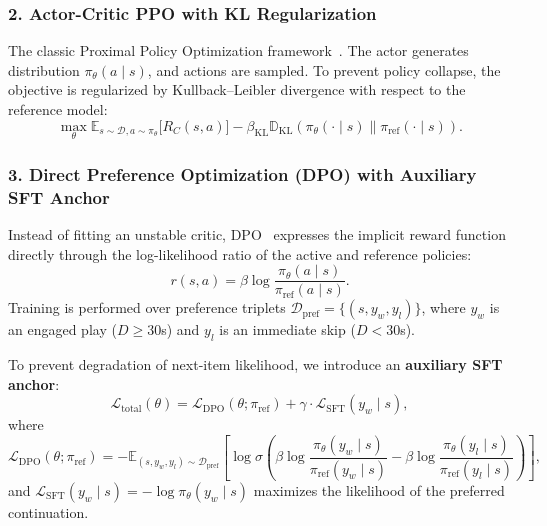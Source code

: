 \subsubsection{2. Actor-Critic PPO with KL Regularization}
The classic Proximal Policy Optimization framework~\cite{schulman2017proximal}. The actor generates distribution $\pi_\theta(a \mid s)$, and actions are sampled. To prevent policy collapse, the objective is regularized by Kullback--Leibler divergence with respect to the reference model:
\begin{equation}
    \max_\theta \mathbb{E}_{s \sim \mathcal{D}, a \sim \pi_\theta} \big[ R_C(s, a) \big] - \beta_{\text{KL}} \mathbb{D}_{\text{KL}}(\pi_\theta(\cdot \mid s) \parallel \pi_{\text{ref}}(\cdot \mid s)).
\end{equation}

\subsubsection{3. Direct Preference Optimization (DPO) with Auxiliary SFT Anchor}
Instead of fitting an unstable critic, DPO~\cite{rafailov2023direct} expresses the implicit reward function directly through the log-likelihood ratio of the active and reference policies:
\begin{equation}
    r(s, a) = \beta \log \frac{\pi_\theta(a \mid s)}{\pi_{\text{ref}}(a \mid s)}.
\end{equation}
Training is performed over preference triplets $\mathcal{D}_{\text{pref}} = \{(s, y_w, y_l)\}$, where $y_w$ is an engaged play ($D \ge 30$s) and $y_l$ is an immediate skip ($D < 30$s).

To prevent degradation of next-item likelihood, we introduce an \textbf{auxiliary SFT anchor}:
\begin{equation}
    \mathcal{L}_{\text{total}}(\theta) = \mathcal{L}_{\text{DPO}}(\theta; \pi_{\text{ref}}) + \gamma \cdot \mathcal{L}_{\text{SFT}}(y_w \mid s),
    \label{eq:dpo_sft}
\end{equation}
where
\begin{equation}
    \mathcal{L}_{\text{DPO}}(\theta; \pi_{\text{ref}}) = - \mathbb{E}_{(s, y_w, y_l) \sim \mathcal{D}_{\text{pref}}} \left[ \log \sigma \left( \beta \log \frac{\pi_\theta(y_w \mid s)}{\pi_{\text{ref}}(y_w \mid s)} - \beta \log \frac{\pi_\theta(y_l \mid s)}{\pi_{\text{ref}}(y_l \mid s)} \right) \right],
\end{equation}
and $\mathcal{L}_{\text{SFT}}(y_w \mid s) = - \log \pi_\theta(y_w \mid s)$ maximizes the likelihood of the preferred continuation.


